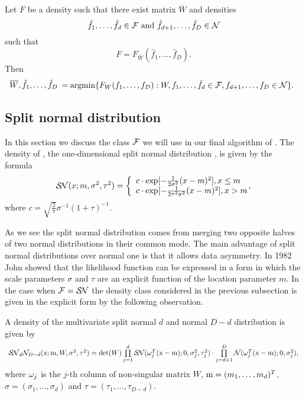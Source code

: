 \begin{theorem}
Let $F$ be a density such that there exist matrix $\overline W$ and densities
$$
\hat f_1,\ldots,\hat f_d \in \mathcal{F} \text{ and } \hat f_{d+1},\ldots,\hat f_D \in \mathcal{N}
$$
such that 
$$
F=F_{\overline W}(\hat f_1,\ldots,\hat f_D).
$$
Then
$$
\begin{array}{l}
\overline W,\hat f_1,\ldots,\hat f_D %
\begin{array}{l}
=\argmin \{F_{W}(f_1,\ldots,f_D): %
W, f_1,\ldots,\bar f_d \in \F,f_{d+1},\ldots,f_D \in \nor
\}.
\end{array}
\end{array}
$$
\end{theorem}

\subsection{Split normal distribution}


In this section we discuss the class $\mathcal{F}$ we will use in our final algorithm of \ICA{}. The density of \SN{}, the one-dimensional split normal distribution \cite{villani2006multivariate}, is given by the formula
$$
\mbox{$\mathcal{S\!N}$}(x;m,\sigma^2,\tau^2) = \left\{ \begin{array}{l}
c \cdot \exp[-\frac{1}{2\sigma^2}(x-m)^2], \textrm{$x\leq m$}\\
c \cdot \exp[-\frac{1}{2\tau^2\sigma^2}(x-m)^2], \textrm{$x>m$}\\
\end{array} \right. \!\!\!\!,
$$
where $c=\sqrt{\frac{2}{\pi}}\sigma^{-1}(1+\tau)^{-1}$. 


As we see the split normal distribution comes from merging two opposite halves of two normal distributions in their common mode. The main advantage of split normal distributions over normal one is that it allows data asymmetry. In 1982 John \cite{john1982three} showed that the likelihood function can be expressed in a  form in which the scale parameters $\sigma$ and $\tau$ are an explicit function of the location parameter $m$.
In the case when $\mathcal{F}=\mbox{$\mathcal{S\!N}$}$
the density class considered in the previous subsection is given in the
explicit form by the following observation.

\begin{observation}\label{def:GSN}
A density of the multivariate split normal $d$ and normal $D-d$ distribution is given by
$$
\begin{array}{l}
\SN_{d}\nor_{D-d}(\x; \m,W, \sigma^2,\tau^2)=%
\det(W) \prod \limits_{j=1}^{d} \SN(\w_j^T(\x-\m);0,\sigma_j^2,\tau_j^2) %
\cdot \prod \limits_{j=d+1}^{D} \nor(\w_j^T(\x-\m);0,\sigma_j^2),
\end{array}
$$
where $\omega_{j}$ is the $j$-th column of non-singular matrix $W$, $\mathrm{m} = (m_1, \ldots, m_d)^T$, $\sigma = (\sigma_{1},\ldots,\sigma_{d})$ and $\tau=(\tau_{1},\ldots,\tau_{D-d})$.
\end{observation}

